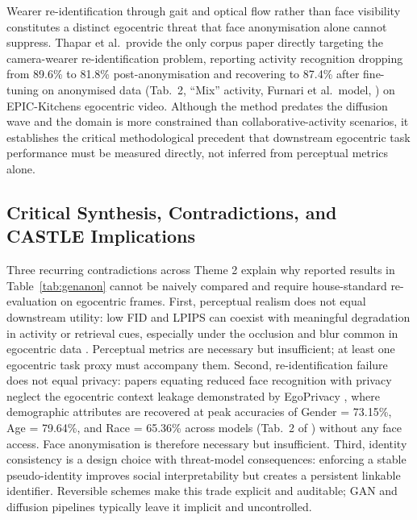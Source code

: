 \documentclass[12pt, onecolumn]{IEEEtran}
\begin{document}
Wearer re-identification through gait and optical flow rather than face
visibility constitutes a distinct egocentric threat that face
anonymisation alone cannot suppress. Thapar et al.\ provide the only
corpus paper directly targeting the camera-wearer re-identification
problem, reporting activity recognition dropping from 89.6\% to 81.8\% post-anonymisation and recovering to 87.4\% after fine-tuning on anonymised data (Tab.~2, ``Mix'' activity, Furnari et al.\ model, \cite{thapar2021anonymizing}) on EPIC-Kitchens egocentric
video. Although the method predates the
diffusion wave and the domain is more constrained than
collaborative-activity scenarios, it establishes the critical
methodological precedent that downstream egocentric task performance
must be measured directly, not inferred from perceptual metrics alone.

\subsection{Critical Synthesis, Contradictions, and CASTLE Implications}

Three recurring contradictions across Theme 2 explain why reported
results in Table~\ref{tab:genanon} cannot be naively compared and
require house-standard re-evaluation on egocentric frames. First,
perceptual realism does not equal downstream utility: low FID
\cite{heusel2017fid} and LPIPS \cite{zhang2018lpips} can coexist with
meaningful degradation in activity or retrieval cues, especially under
the occlusion and blur common in egocentric data
\cite{ilic2024selective, thapar2021anonymizing}. Perceptual
metrics are necessary but insufficient; at least one egocentric task
proxy must accompany them. Second, re-identification failure does not
equal privacy: papers equating reduced face recognition with privacy
neglect the egocentric context leakage demonstrated by EgoPrivacy
\cite{li2025egoprivacy}, where demographic attributes are recovered at peak accuracies of
Gender = 73.15\%, Age = 79.64\%, and Race = 65.36\% across models (Tab.~2 of \cite{li2025egoprivacy}) without any face
access. Face anonymisation is therefore necessary but insufficient.
Third, identity consistency is a design choice with threat-model
consequences: enforcing a stable pseudo-identity improves social
interpretability but creates a persistent linkable identifier.
Reversible schemes \cite{muhammad2026refacex, zhang2025keydriven}
make this trade explicit and auditable; GAN and diffusion pipelines
typically leave it implicit and uncontrolled.
\end{document}

